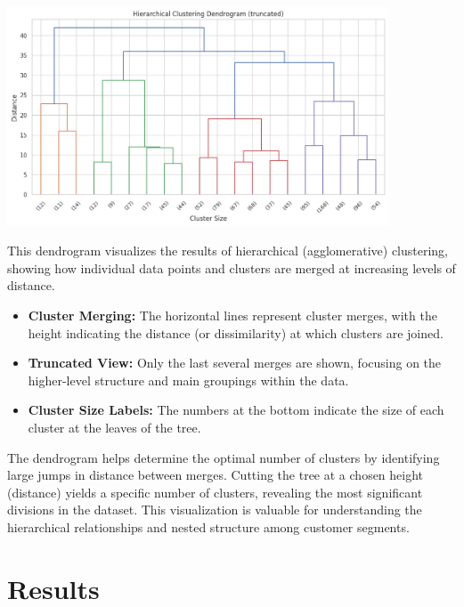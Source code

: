\documentclass[a4paper]{article}
\begin{document}
\begin{multicols}{2}
\noindent
\begin{minipage}{\columnwidth}
\centering
\includegraphics[width=0.85\textwidth]{plots/Hierarchical Clustering Dendrogram (truncated).png}
\label{fig:hierarchical_dendrogram}
\end{minipage}

This dendrogram visualizes the results of hierarchical (agglomerative) clustering, showing how individual data points and clusters are merged at increasing levels of distance.

\begin{itemize}
    \item \textbf{Cluster Merging:} The horizontal lines represent cluster merges, with the height indicating the distance (or dissimilarity) at which clusters are joined.
    \item \textbf{Truncated View:} Only the last several merges are shown, focusing on the higher-level structure and main groupings within the data.
    \item \textbf{Cluster Size Labels:} The numbers at the bottom indicate the size of each cluster at the leaves of the tree.
\end{itemize}

The dendrogram helps determine the optimal number of clusters by identifying large jumps in distance between merges. Cutting the tree at a chosen height (distance) yields a specific number of clusters, revealing the most significant divisions in the dataset. This visualization is valuable for understanding the hierarchical relationships and nested structure among customer segments.










\section{Results}


\end{multicols}
\end{document}
